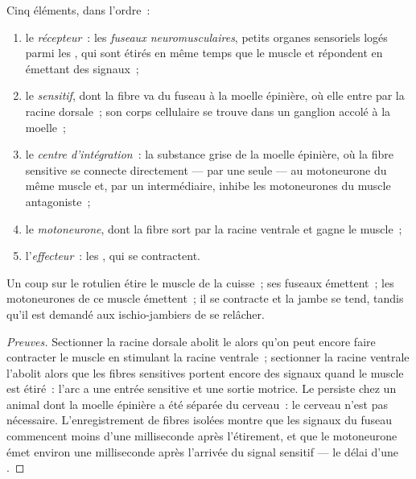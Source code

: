 \begin{proposition}\label{prop:g12:stretch-reflex:arc}
Cinq éléments, dans l'ordre~:
\begin{enumerate}
  \item le \emph{récepteur}~: les \emph{fuseaux neuromusculaires},
        petits organes sensoriels logés parmi les ,
        qui sont étirés en même temps que le muscle et répondent en
        émettant des signaux~;
  \item le \emph{ sensitif}, dont la fibre va du fuseau à la
        moelle épinière, où elle entre par la racine dorsale~; son
        corps cellulaire se trouve dans un ganglion accolé à la
        moelle~;
  \item le \emph{centre d'intégration}~: la substance grise de la
        moelle épinière, où la fibre sensitive se connecte
        directement --- par une seule  --- au motoneurone du
        même muscle et, par un  intermédiaire, inhibe les
        motoneurones du muscle antagoniste~;
  \item le \emph{motoneurone}, dont la fibre sort par la racine
        ventrale et gagne le muscle~;
  \item l'\emph{effecteur}~: les , qui se
        contractent.
\end{enumerate}
Un coup sur le  rotulien étire le muscle de la cuisse~; ses
fuseaux émettent~; les motoneurones de ce muscle émettent~; il se
contracte et la jambe se tend, tandis qu'il est demandé aux
ischio-jambiers de se relâcher.
\end{proposition}
\begin{proof}[Preuves]
Sectionner la racine dorsale abolit le  alors qu'on peut encore
faire contracter le muscle en stimulant la racine ventrale~;
sectionner la racine ventrale l'abolit alors que les fibres sensitives
portent encore des signaux quand le muscle est étiré~: l'arc a une
entrée sensitive et une sortie motrice. Le  persiste chez un
animal dont la moelle épinière a été séparée du cerveau~: le cerveau
n'est pas nécessaire. L'enregistrement de fibres isolées montre que
les signaux du fuseau commencent moins d'une milliseconde après
l'étirement, et que le motoneurone émet environ une milliseconde après
l'arrivée du signal sensitif --- le délai d'une .
\end{proof}

